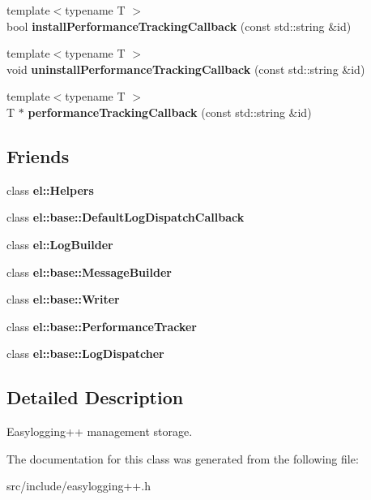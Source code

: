 \begin{DoxyCompactItemize}
{\footnotesize template$<$typename T $>$ }\\bool {\bfseries install\+Performance\+Tracking\+Callback} (const std\+::string \&id)
\item 
\mbox{\label{classel_1_1base_1_1_storage_a0e69baf4bf3140fb7bc88bb386d933cf}} 
{\footnotesize template$<$typename T $>$ }\\void {\bfseries uninstall\+Performance\+Tracking\+Callback} (const std\+::string \&id)
\item 
\mbox{\label{classel_1_1base_1_1_storage_aa511779589370416030d9fc1149a32fd}} 
{\footnotesize template$<$typename T $>$ }\\T $\ast$ {\bfseries performance\+Tracking\+Callback} (const std\+::string \&id)
\end{DoxyCompactItemize}
\subsection*{Friends}
\begin{DoxyCompactItemize}
\item 
\mbox{\label{classel_1_1base_1_1_storage_a2fb8a2c02cbf86247f093c118bed877a}} 
class {\bfseries el\+::\+Helpers}
\item 
\mbox{\label{classel_1_1base_1_1_storage_a42b1de96d584ae4fecbfc2b9aff95052}} 
class {\bfseries el\+::base\+::\+Default\+Log\+Dispatch\+Callback}
\item 
\mbox{\label{classel_1_1base_1_1_storage_a8c584bcf767a4d007311a7408b22ad62}} 
class {\bfseries el\+::\+Log\+Builder}
\item 
\mbox{\label{classel_1_1base_1_1_storage_a81bbf6fe31fab133d182efa8367304f1}} 
class {\bfseries el\+::base\+::\+Message\+Builder}
\item 
\mbox{\label{classel_1_1base_1_1_storage_a7a728edbb2761d151832daa74d5b2736}} 
class {\bfseries el\+::base\+::\+Writer}
\item 
\mbox{\label{classel_1_1base_1_1_storage_a6a4d7851e1984800be3c230f06a79528}} 
class {\bfseries el\+::base\+::\+Performance\+Tracker}
\item 
\mbox{\label{classel_1_1base_1_1_storage_a9b37b28ea1c5f8f862cc89f135711d92}} 
class {\bfseries el\+::base\+::\+Log\+Dispatcher}
\end{DoxyCompactItemize}


\subsection{Detailed Description}
Easylogging++ management storage. 

The documentation for this class was generated from the following file\+:\begin{DoxyCompactItemize}
\item 
src/include/easylogging++.\+h\end{DoxyCompactItemize}
